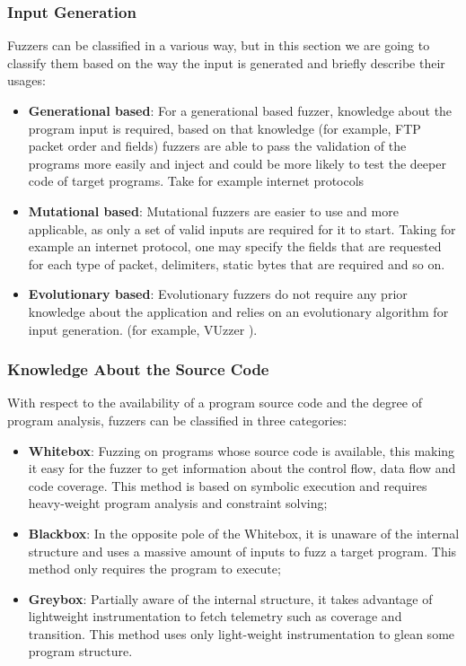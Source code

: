 \documentclass[10pt,a4paper,english,onecolumn]{IEEEtran}
\begin{document}
\subsubsection{Input Generation}

Fuzzers can be classified \cite{fuzzing_another_survey} in a various way, but in this section we are going to classify them based on the way the input is generated and briefly describe their usages:

\begin{itemize}
    \item \textbf{Generational based}: For a generational based fuzzer, knowledge about the program input is required, based on that knowledge (for example, FTP packet order and fields) fuzzers are able to pass the validation of the programs more easily and inject and could be more likely to test the deeper code of target programs. Take for example internet protocols
    \item \textbf{Mutational based}: Mutational fuzzers are easier to use and more applicable, as only a set of valid inputs are required for it to start. Taking for example an internet protocol, one may specify the fields that are requested for each type of packet, delimiters, static bytes that are required and so on.
    \item \textbf{Evolutionary based}: Evolutionary fuzzers do not require any prior knowledge about the application and relies on an evolutionary algorithm for input generation. (for example, VUzzer \cite{vfuzzer}).
\end{itemize}

\subsubsection{Knowledge About the Source Code}

With respect to the availability of a program source code and the degree of program analysis, fuzzers can be classified in three categories:

\begin{itemize}
    \item \textbf{Whitebox}: Fuzzing on programs whose source code is available, this making it easy for the fuzzer to get information about the control flow, data flow and code coverage. This method is based on symbolic execution and requires heavy-weight program analysis and constraint solving; 
    \item \textbf{Blackbox}: In the opposite pole of the Whitebox, it is unaware of the internal structure and uses a massive amount of inputs to fuzz a target program. This method only requires the program to execute;
    \item \textbf{Greybox}: Partially aware of the internal structure, it takes advantage of lightweight instrumentation to fetch telemetry such as coverage and transition. This method uses only light-weight instrumentation to glean some program structure.
\end{itemize}
\end{document}
